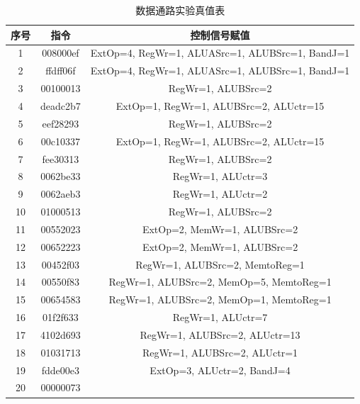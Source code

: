 \documentclass[12pt, a4paper]{ctexart}
\begin{document}
\begin{table}[H]
    \centering
    \begin{tabular}{|c|c|c|}
        \hline
        序号 & 指令 & 控制信号赋值 \\ \hline
        1 & 008000ef & ExtOp=4, RegWr=1, ALUASrc=1, ALUBSrc=1, BandJ=1 \\ \hline
        2 & ffdff06f & ExtOp=4, RegWr=1, ALUASrc=1, ALUBSrc=1, BandJ=1 \\ \hline
        3 & 00100013 & RegWr=1, ALUBSrc=2 \\ \hline
        4 & deadc2b7 & ExtOp=1, RegWr=1, ALUBSrc=2, ALUctr=15 \\ \hline
        5 & eef28293 & RegWr=1, ALUBSrc=2 \\ \hline
        6 & 00c10337 & ExtOp=1, RegWr=1, ALUBSrc=2, ALUctr=15 \\ \hline
        7 & fee30313 & RegWr=1, ALUBSrc=2 \\ \hline
        8 & 0062be33 & RegWr=1, ALUctr=3 \\ \hline
        9 & 0062aeb3 & RegWr=1, ALUctr=2 \\ \hline
        10 & 01000513 & RegWr=1, ALUBSrc=2 \\ \hline
        11 & 00552023 & ExtOp=2, MemWr=1, ALUBSrc=2 \\ \hline
        12 & 00652223 & ExtOp=2, MemWr=1, ALUBSrc=2 \\ \hline
        13 & 00452f03 & RegWr=1, ALUBSrc=2, MemtoReg=1 \\ \hline
        14 & 00550f83 & RegWr=1, ALUBSrc=2, MemOp=5, MemtoReg=1 \\ \hline
        15 & 00654583 & RegWr=1, ALUBSrc=2, MemOp=1, MemtoReg=1 \\ \hline
        16 & 01f2f633 & RegWr=1, ALUctr=7 \\ \hline
        17 & 4102d693 & RegWr=1, ALUBSrc=2, ALUctr=13 \\ \hline
        18 & 01031713 & RegWr=1, ALUBSrc=2, ALUctr=1 \\ \hline
        19 & fdde00e3 & ExtOp=3, ALUctr=2, BandJ=4 \\ \hline
        20 & 00000073 &  \\ \hline
    \end{tabular}
    \caption{数据通路实验真值表}
\end{table}
\end{document}
